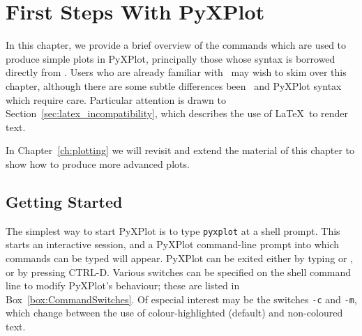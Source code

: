 %
%
%
%
%



\chapter{First Steps With PyXPlot}
\label{ch:first_steps}

In this chapter, we provide a brief overview of the commands which are used to
produce simple plots in PyXPlot, principally those whose syntax is borrowed
directly from \gnuplot. Users who are already familiar with \gnuplot\ may wish
to skim over this chapter, although there are some subtle differences been
\gnuplot\ and PyXPlot syntax which require care. Particular attention is drawn
to Section~\ref{sec:latex_incompatibility}, which describes the use of \LaTeX\
to render text.

In Chapter~\ref{ch:plotting} we will revisit and extend the material of this
chapter to show how to produce more advanced plots.

\section{Getting Started}

The simplest way to start PyXPlot is to type {\tt pyxplot} at a shell prompt.
This starts an interactive session, and a PyXPlot command-line prompt into
which commands can be typed will appear. PyXPlot can be exited either by typing
\indcmdts{exit} or \indcmdts{quit}, or by pressing CTRL-D. Various switches can
be specified on the shell command line to modify PyXPlot's behaviour; these are
listed in Box~\ref{box:CommandSwitches}.  Of especial interest may be the
switches {\tt -c} and {\tt -m}, which change between the use of
colour-highlighted (default) and non-coloured text.

